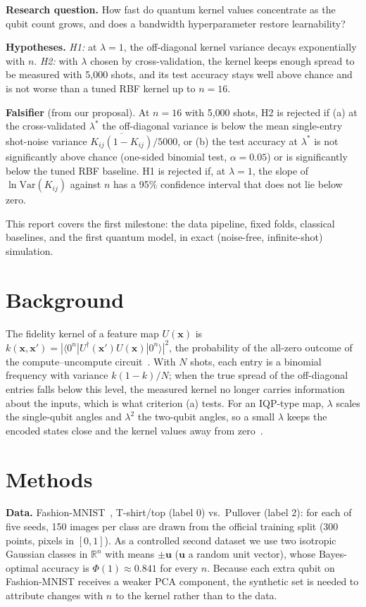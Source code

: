 \documentclass[conference]{IEEEtran}
\begin{document}
\textbf{Research question.} How fast do quantum kernel values concentrate as the qubit count grows, and does a bandwidth hyperparameter restore learnability?

\textbf{Hypotheses.} \emph{H1:} at $\lambda=1$, the off-diagonal kernel variance decays exponentially with $n$. \emph{H2:} with $\lambda$ chosen by cross-validation, the kernel keeps enough spread to be measured with 5{,}000 shots, and its test accuracy stays well above chance and is not worse than a tuned RBF kernel up to $n=16$.

\textbf{Falsifier} (from our proposal). At $n=16$ with 5{,}000 shots, H2 is rejected if (a) at the cross-validated $\lambda^{*}$ the off-diagonal variance is below the mean single-entry shot-noise variance $\overline{K_{ij}(1-K_{ij})}/5000$, or (b) the test accuracy at $\lambda^{*}$ is not significantly above chance (one-sided binomial test, $\alpha=0.05$) or is significantly below the tuned RBF baseline. H1 is rejected if, at $\lambda=1$, the slope of $\ln\mathrm{Var}(K_{ij})$ against $n$ has a 95\% confidence interval that does not lie below zero.

This report covers the first milestone: the data pipeline, fixed folds, classical baselines, and the first quantum model, in exact (noise-free, infinite-shot) simulation.

\section{Background}
The fidelity kernel of a feature map $U(\mathbf{x})$ is $k(\mathbf{x},\mathbf{x}')=|\langle0^{n}|U^{\dagger}(\mathbf{x}')U(\mathbf{x})|0^{n}\rangle|^{2}$, the probability of the all-zero outcome of the compute--uncompute circuit~\cite{havlicek2019supervised}. With $N$ shots, each entry is a binomial frequency with variance $k(1-k)/N$; when the true spread of the off-diagonal entries falls below this level, the measured kernel no longer carries information about the inputs, which is what criterion (a) tests. For an IQP-type map, $\lambda$ scales the single-qubit angles and $\lambda^{2}$ the two-qubit angles, so a small $\lambda$ keeps the encoded states close and the kernel values away from zero~\cite{shaydulin2022bandwidth}.

\section{Methods}
\textbf{Data.} Fashion-MNIST~\cite{xiao2017fashion}, T-shirt/top (label 0) vs.\ Pullover (label 2): for each of five seeds, 150 images per class are drawn from the official training split (300 points, pixels in $[0,1]$). As a controlled second dataset we use two isotropic Gaussian classes in $\mathbb{R}^{n}$ with means $\pm\mathbf{u}$ ($\mathbf{u}$ a random unit vector), whose Bayes-optimal accuracy is $\Phi(1)\approx0.841$ for every $n$. Because each extra qubit on Fashion-MNIST receives a weaker PCA component, the synthetic set is needed to attribute changes with $n$ to the kernel rather than to the data.
\end{document}
